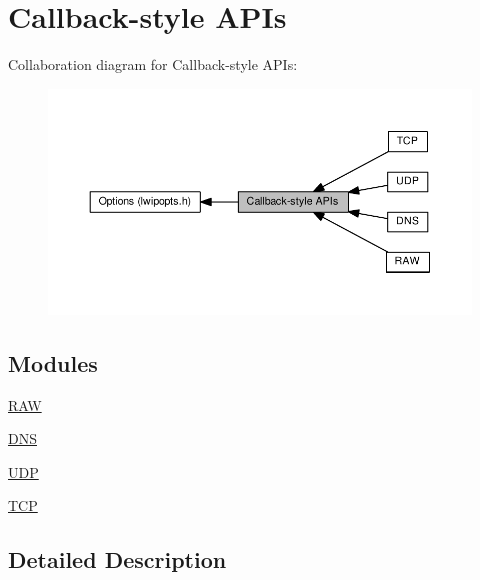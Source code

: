 \hypertarget{group__lwip__opts__callback}{}\section{Callback-\/style A\+P\+Is}
\label{group__lwip__opts__callback}
Collaboration diagram for Callback-\/style A\+P\+Is\+:
\nopagebreak
\begin{figure}[H]
\begin{center}
\leavevmode
\includegraphics[width=350pt]{group__lwip__opts__callback}
\end{center}
\end{figure}
\subsection*{Modules}
\begin{DoxyCompactItemize}
\item 
\hyperlink{group__lwip__opts__raw}{R\+AW}
\item 
\hyperlink{group__lwip__opts__dns}{D\+NS}
\item 
\hyperlink{group__lwip__opts__udp}{U\+DP}
\item 
\hyperlink{group__lwip__opts__tcp}{T\+CP}
\end{DoxyCompactItemize}


\subsection{Detailed Description}
